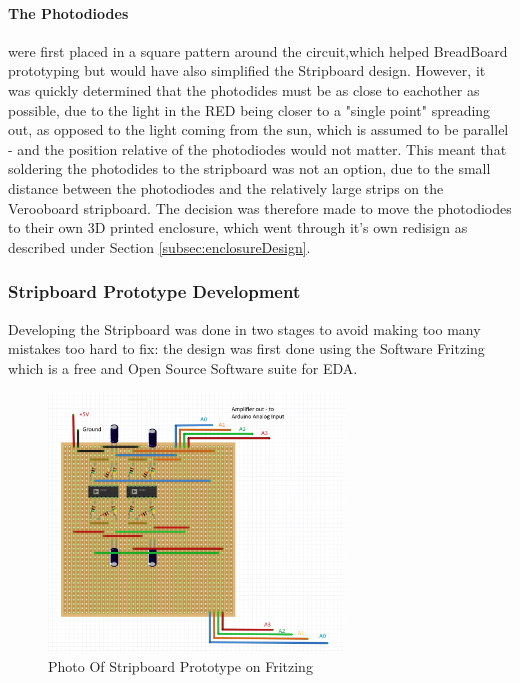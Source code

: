\paragraph{The Photodiodes} were first placed in a square pattern around the circuit,which helped BreadBoard prototyping but would have also simplified the Stripboard design. However, it was quickly determined that the photodides must be as close to eachother as possible, due to the light in the \ac{RED} being closer to a "single point" spreading out, as opposed to the light coming from the sun, which is assumed to be parallel - and the position relative of the photodiodes would not matter. This meant that soldering the photodides to the stripboard was not an option, due to the small distance between the photodiodes and the relatively large strips on the Verooboard stripboard. The decision was therefore made to move the photodiodes to their own 3D printed enclosure, which went through it's own redisign as described under Section \ref{subsec:enclosureDesign}.





\subsubsection*{Stripboard Prototype Development}
Developing the Stripboard was done in two stages to avoid making too many mistakes too hard to fix: the design was first done using the Software Fritzing which is a free and Open Source Software suite for \ac{EDA}. 
%
\begin{figure}[htbp] %
  \centering
  \includegraphics[width=0.7\textwidth]{chapters/methodology/prototype/StripboardPhotoFritzing.jpg}
  \caption{Photo Of Stripboard Prototype on Fritzing}
  \label{fig:StripboardFritzing}
\end{figure}

